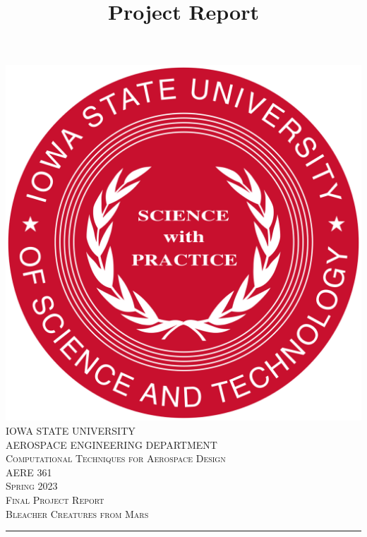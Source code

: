 \documentclass[12pt]{article}
\begin{document}
\title{Project Report}

\begin{titlepage}
	\centering
    \vspace*{0.5 cm}
    \includegraphics[scale = 0.11]{isu_seal.png}\\[1.0 cm]	%
    \textsc{\LARGE IOWA STATE UNIVERSITY}\\[2.0 cm]
    \textsc{\large AEROSPACE ENGINEERING DEPARTMENT}\\[0.2 cm]
    \textsc{\large Computational Techniques for Aerospace Design}\\[0.2 cm]
	\textsc{\Large AERE 361}\\[0.5 cm]				%
	\textsc{\Large Spring 2023}\\[0.5 cm]				%
	\textsc{\Large Final Project Report}\\[0.2 cm]
	\textsc{\Large Bleacher Creatures from Mars}\\[0.2 cm]
	\rule{\linewidth}{0.2 mm} \\[0.4 cm]
	
	
	\begin{minipage}{0.8\textwidth}
		

\end{minipage}
\end{titlepage}
\end{document}
